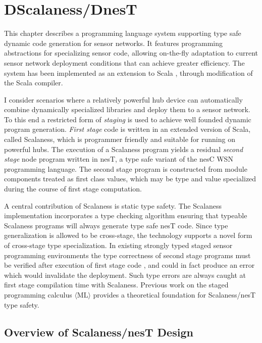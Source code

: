 
\chapter{DScalaness/DnesT}
\label{chapter-dscalaness-dnest}


This chapter describes a programming language system supporting type safe dynamic code
generation for sensor networks. It features programming abstractions for specializing sensor
code, allowing on-the-fly adaptation to current sensor network deployment conditions that can
achieve greater efficiency. The system has been implemented as an extension to Scala
\cite{PiS2}, through modification of the Scala compiler.

I consider scenarios where a relatively powerful hub device can automatically combine
dynamically specialized libraries and deploy them to a sensor network. To this end a restricted
form of \emph{staging} \cite{Taha-MetaML,DBLP:conf/icess/Taha04,289140} is used to achieve well
founded dynamic program generation. \emph{First stage} code is written in an extended version of
Scala, called Scalaness, which is programmer friendly and suitable for running on powerful hubs.
The execution of a Scalaness program yields a residual \emph{second stage} node program written
in nesT, a type safe variant of the nesC WSN programming language. The second stage program is
constructed from module components treated as first class values, which may be type and value
specialized during the course of first stage computation.

A central contribution of Scalaness is static type safety. The Scalaness implementation
incorporates a type checking algorithm ensuring that typeable Scalaness programs will always
generate type safe nesT code. Since type generalization is allowed to be cross-stage, the
technology supports a novel form of cross-stage type specialization. In existing strongly typed
staged sensor programming environments the type correctness of second stage programs must be
verified after execution of first stage code \cite{Mainland-Flask-2008}, and could in fact
produce an error which would invalidate the deployment. Such type errors are always caught at
first stage compilation time with Scalaness. Previous work on the staged programming calculus
$\langle \text{ML} \rangle$ \cite{FramedML} provides a theoretical foundation for Scalaness/nesT
type safety.

\section{Overview of Scalaness/nesT Design}

